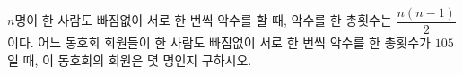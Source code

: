 $n$명이 한 사람도 빠짐없이 서로 한 번씩 악수를 할 때, 악수를 한 총횟수는 $\dfrac{n(n-1)}{2}$이다. 어느 동호회 회원들이 한 사람도 빠짐없이 서로 한 번씩 악수를 한 총횟수가 $105$일 때, 이 동호회의 회원은 몇 명인지 구하시오.
